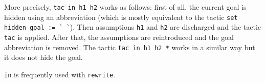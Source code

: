\documentclass[a4paper]{article}
\begin{document}
More precisely, \verb|tac in h1 h2| works as follows: first of all, the current goal is hidden using an abbreviation (which is mostly equivalent to the tactic \verb'set hidden_goal := `_`'). Then assumptions \verb|h1| and \verb|h2| are discharged and the tactic \verb|tac| is applied. After that, the assumptions are reintroduced and the goal abbreviation is removed. The tactic \verb|tac in h1 h2 *| works in a similar way but it does not hide the goal.

\verb|in| is frequently used with \verb|rewrite|.

\end{document}
